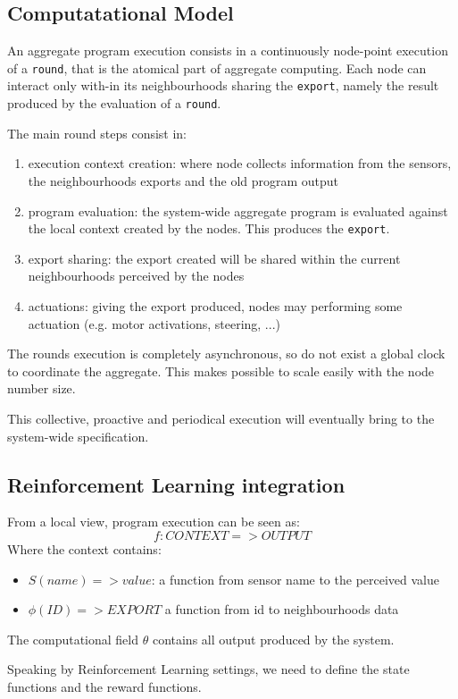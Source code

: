 \documentclass[
  twocolumn,
]{ceurart}
\begin{document}
\subsection{Computatational Model}
An aggregate program execution consists in a continuously node-point execution of a \texttt{round}, that is
 the atomical part of aggregate computing.
%
Each node can interact only with-in its neighbourhoods sharing the \texttt{export}, namely the result produced by
 the evaluation of a \texttt{round}.

The main round steps consist in:
\begin{enumerate}
  \item execution context creation: where node collects information from the sensors, the neighbourhoods exports and the old
  program output
  \item program evaluation: the system-wide aggregate program is evaluated against the local context created by the nodes. 
  This produces the \texttt{export}.
  \item export sharing: the export created will be shared within the current neighbourhoods perceived by the nodes
  \item actuations: giving the export produced, nodes may performing some actuation (e.g. motor activations, steering, ...)
\end{enumerate}

The rounds execution is completely asynchronous, so do not exist a global clock to coordinate the aggregate. This makes possible
 to scale easily with the node number size.

This collective, proactive and periodical execution will eventually bring to the system-wide specification.

\subsection{Reinforcement Learning integration}
From a local view, program execution can be seen as:
$$
f : CONTEXT => OUTPUT
$$
Where the context contains:
\begin{itemize}
  \item $S(name) => value$: a function from sensor name to the perceived value
  \item $\phi(ID) => EXPORT$ a function from id to neighbourhoods data
\end{itemize}
The computational field $\theta$ contains all output produced by the system.

Speaking by Reinforcement Learning settings, we need to define the state functions
and the reward functions.
\end{document}
